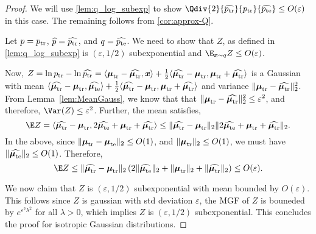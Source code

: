 \begin{proof}
    We will use \cref{lem:q_log_subexp} to show $\Qdiv{2}{\widehat{\ptr}}{\ptr}{\widehat{\pte}} \leq O(\varepsilon)$ in this case. The remaining follows from \cref{cor:approx-Q}.

    Let $p = p_{\mathrm{tr}}$, $\widehat{p} = \widehat{p_{\mathrm{tr}}}$, and $q = \widehat{p_{\mathrm{te}}}$. We need to show that $Z$, as defined in \cref{lem:q_log_subexp} is $(\varepsilon,1/2)$ subexponential and $\E_{\xx\sim q}Z \leq O(\varepsilon)$.
    
    
    Now, $Z = \ln p_{\mathrm{tr}} - \ln \widehat{p_{\mathrm{tr}}} = \langle \boldsymbol{\mathit{\mu}}_{\mathrm{tr}} - \widehat{\boldsymbol{\mathit{\mu}}_{\mathrm{tr}}}, \boldsymbol{\mathit{x}}\rangle + \frac{1}{2}\langle \widehat{\boldsymbol{\mathit{\mu}}_{\mathrm{tr}}} - \boldsymbol{\mathit{\mu}}_{\mathrm{tr}}, \boldsymbol{\mathit{\mu}}_{\mathrm{tr}} + \widehat{\boldsymbol{\mathit{\mu}}_{\mathrm{tr}}}\rangle$ is a Gaussian with mean $ \langle \widehat{\boldsymbol{\mathit{\mu}}_{\mathrm{tr}}} - \boldsymbol{\mathit{\mu}}_{\mathrm{tr}},\widehat{\boldsymbol{\mathit{\mu}}_{\mathrm{te}}}\rangle + \frac{1}{2}\langle \widehat{\boldsymbol{\mathit{\mu}}_{\mathrm{tr}}} - \boldsymbol{\mathit{\mu}}_{\mathrm{tr}}, \boldsymbol{\mathit{\mu}}_{\mathrm{tr}} + \widehat{\boldsymbol{\mathit{\mu}}_{\mathrm{tr}}}\rangle$ and variance $\|\boldsymbol{\mathit{\mu}}_{\mathrm{tr}} - \widehat{\boldsymbol{\mathit{\mu}}_{\mathrm{tr}}}\|^2_2$. From Lemma~\ref{lem:MeanGauss}, we know that that $\|\boldsymbol{\mathit{\mu}}_{\mathrm{tr}} - \widehat{\boldsymbol{\mathit{\mu}}_{\mathrm{tr}}}\|^2_2\leq \varepsilon^2$, and therefore, $\Var(Z)\leq \varepsilon^2$. Further, the mean satisfies,  
 \[
    \E Z =  \langle \widehat{\mtr} - \mtr,2\widehat{\mte} + \mtr + \widehat{\mtr}\rangle 
    \leq\| \widehat{\mtr} - \mtr\|_2 \|2\widehat{\mte} + \mtr + \widehat{\mtr}\|_2.
\]
In the above, since  $\|\boldsymbol{\mathit{\mu}}_{\mathrm{tr}}-\boldsymbol{\mathit{\mu}}_{\mathrm{te}}\|_2\leq O(1)$, and $\|\boldsymbol{\mathit{\mu}}_{\mathrm{tr}}\|_2\leq O(1)$, we must have $\|\widehat{\boldsymbol{\mathit{\mu}}_{\mathrm{te}}}\|_2\leq O(1)$. Therefore,
 \[
    \E Z 
    \leq\| \widehat{\mtr} - \mtr\|_2 \left(2\|\widehat{\mte}\|_2 + \|\mtr\|_2 + \|\widehat{\mtr}\|_2\right) \leq O(\varepsilon).
\]

We now claim that $Z$ is $(\varepsilon,1/2)$ subexponential with mean bounded by $O(\varepsilon)$. This follows since $Z$ is gaussian with std deviation $\varepsilon$, the MGF of $Z$ is bouneded by $e^{\varepsilon^2 \lambda^2}$ for all $\lambda>0$, which implies $Z$ is $(\varepsilon,1/2)$ subexponential. This concludes the proof for isotropic Gaussian distributions.
\end{proof}

\GaussBias*

